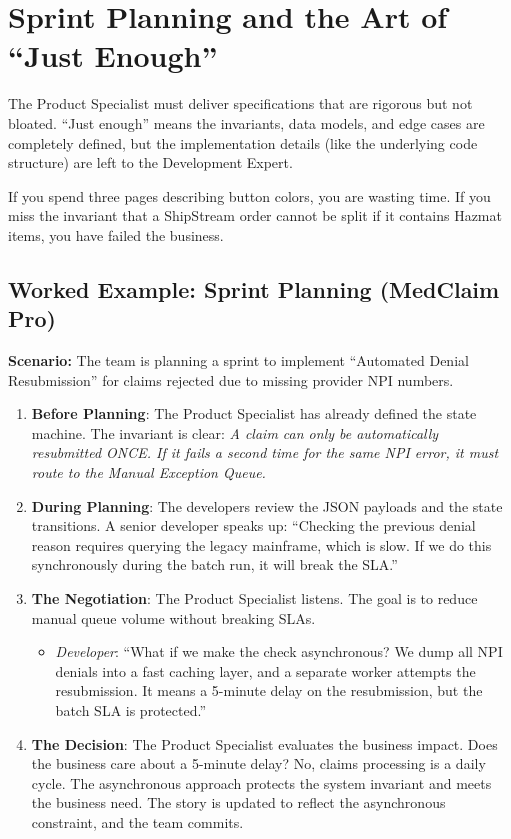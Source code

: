 \section{Sprint Planning and the Art of ``Just
Enough''}\label{sprint-planning-and-the-art-of-just-enough}

The Product Specialist must deliver specifications that are rigorous but
not bloated. ``Just enough'' means the invariants, data models, and edge
cases are completely defined, but the implementation details (like the
underlying code structure) are left to the Development Expert.

If you spend three pages describing button colors, you are wasting time.
If you miss the invariant that a ShipStream order cannot be split if it
contains Hazmat items, you have failed the business.

\subsection{Worked Example: Sprint Planning (MedClaim
Pro)}\label{worked-example-sprint-planning-medclaim-pro}

\textbf{Scenario:} The team is planning a sprint to implement
``Automated Denial Resubmission'' for claims rejected due to missing
provider NPI numbers.

\begin{enumerate}
\def\labelenumi{\arabic{enumi}.}
\tightlist
\item
  \textbf{Before Planning}: The Product Specialist has already defined
  the state machine. The invariant is clear: \emph{A claim can only be
  automatically resubmitted ONCE. If it fails a second time for the same
  NPI error, it must route to the Manual Exception Queue.}
\item
  \textbf{During Planning}: The developers review the JSON payloads and
  the state transitions. A senior developer speaks up: ``Checking the
  previous denial reason requires querying the legacy mainframe, which
  is slow. If we do this synchronously during the batch run, it will
  break the SLA.''
\item
  \textbf{The Negotiation}: The Product Specialist listens. The goal is
  to reduce manual queue volume without breaking SLAs.

  \begin{itemize}
  \tightlist
  \item
    \emph{Developer}: ``What if we make the check asynchronous? We dump
    all NPI denials into a fast caching layer, and a separate worker
    attempts the resubmission. It means a 5-minute delay on the
    resubmission, but the batch SLA is protected.''
  \end{itemize}
\item
  \textbf{The Decision}: The Product Specialist evaluates the business
  impact. Does the business care about a 5-minute delay? No, claims
  processing is a daily cycle. The asynchronous approach protects the
  system invariant and meets the business need. The story is updated to
  reflect the asynchronous constraint, and the team commits.
\end{enumerate}


